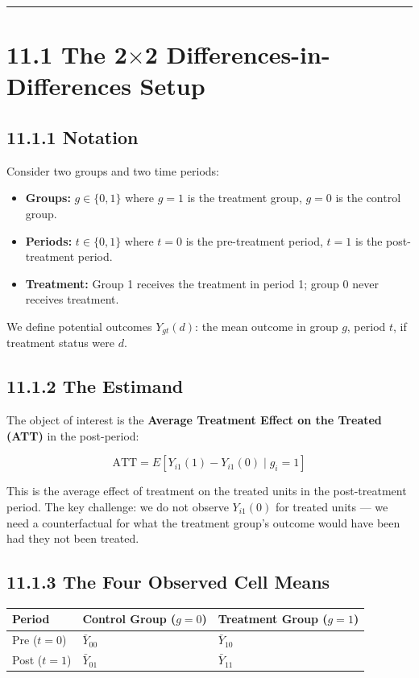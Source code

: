 \medskip\hrule\medskip

\section{11.1 The 2$\times$2 Differences-in-Differences Setup}

\subsection{11.1.1 Notation}

Consider two groups and two time periods:
\begin{itemize}
\item \textbf{Groups:} $g \in \{0, 1\}$ where $g = 1$ is the treatment group, $g = 0$ is the control group.
\item \textbf{Periods:} $t \in \{0, 1\}$ where $t = 0$ is the pre-treatment period, $t = 1$ is the post-treatment period.
\item \textbf{Treatment:} Group 1 receives the treatment in period 1; group 0 never receives treatment.
\end{itemize}

We define potential outcomes $Y_{gt}(d)$: the mean outcome in group $g$, period $t$, if treatment status were $d$.

\subsection{11.1.2 The Estimand}

The object of interest is the \textbf{Average Treatment Effect on the Treated (ATT)} in the post-period:

\[
\text{ATT} = E[Y_{i1}(1) - Y_{i1}(0) \mid g_i = 1]
\]

This is the average effect of treatment on the treated units in the post-treatment period. The key challenge: we do not observe $Y_{i1}(0)$ for treated units --- we need a counterfactual for what the treatment group's outcome would have been had they not been treated.

\subsection{11.1.3 The Four Observed Cell Means}

\begin{center}
\begin{tabular}{@{} l l l @{}}
\toprule
\textbf{Period} & \textbf{Control Group ($g=0$)} & \textbf{Treatment Group ($g=1$)} \\
\midrule
Pre ($t=0$) & $\bar{Y}_{00}$ & $\bar{Y}_{10}$ \\
Post ($t=1$) & $\bar{Y}_{01}$ & $\bar{Y}_{11}$ \\
\bottomrule
\end{tabular}
\end{center}

